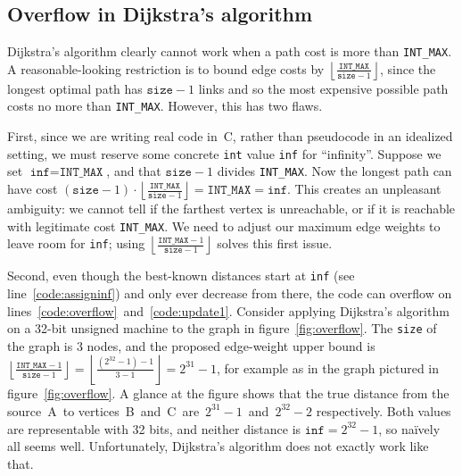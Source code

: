 \subsection{Overflow in Dijkstra's algorithm}
\label{sec:dijkoverflow}

Dijkstra's algorithm clearly cannot work when a path
cost is more than \texttt{INT\_MAX}.  A reasonable-looking restriction
is to bound edge costs by
$\left\lfloor\frac{\texttt{INT\_MAX}}{\texttt{size}-1}\right\rfloor$, since
the longest optimal path has $\texttt{size}-1$ links and so the
most expensive possible path costs no more than \texttt{INT\_MAX}.
However, this has two flaws.

First, since we are writing real code in~C,
rather than pseudocode in an idealized setting, we must reserve some
concrete \texttt{int} value \texttt{inf} for ``infinity''.  Suppose we 
set $\texttt{inf}=\texttt{INT\_MAX}$, and that $\texttt{size}-1$ divides \texttt{INT\_MAX}.  Now the longest path can have cost $(\texttt{size}-1)\cdot\left\lfloor\frac{\texttt{INT\_MAX}}{\texttt{size}-1}\right\rfloor = \texttt{INT\_MAX} = \texttt{inf}$.  This creates an unpleasant ambiguity: we cannot tell if the farthest vertex is unreachable, or if it is reachable with legitimate cost \texttt{INT\_MAX}.  We need to adjust our maximum edge weights to leave room for \texttt{inf}; using $\left\lfloor\frac{\texttt{INT\_MAX}-1}{\texttt{size}-1}\right\rfloor$ solves this first issue.



Second, even though the best-known distances start at \texttt{inf}
(see line~\ref{code:assigninf}) and only ever decrease from there, the code can
overflow on lines~\ref{code:overflow}~and~\ref{code:update1}.
Consider applying Dijkstra's algorithm on a 32-bit unsigned machine to
the graph in figure~\ref{fig:overflow}.  The \texttt{size} of the graph is 3 nodes, and the proposed edge-weight upper bound is $\left\lfloor\frac{\texttt{INT\_MAX}-1}{\texttt{size}-1}\right\rfloor = \left\lfloor\frac{(2^{32}-1)-1}{3-1}\right\rfloor = 2^{31}-1$, for example as in the graph pictured in figure~\ref{fig:overflow}.  A glance at the figure shows that the true distance from the source~A~to vertices~B~and~C~are~$2^{31}-1$~and~$2^{32}-2$ respectively. Both values are representable with 32 bits, and neither distance is $\texttt{inf}=2^{32}-1$, so na\"ively all seems well. Unfortunately, Dijkstra's algorithm does not exactly work like that.

